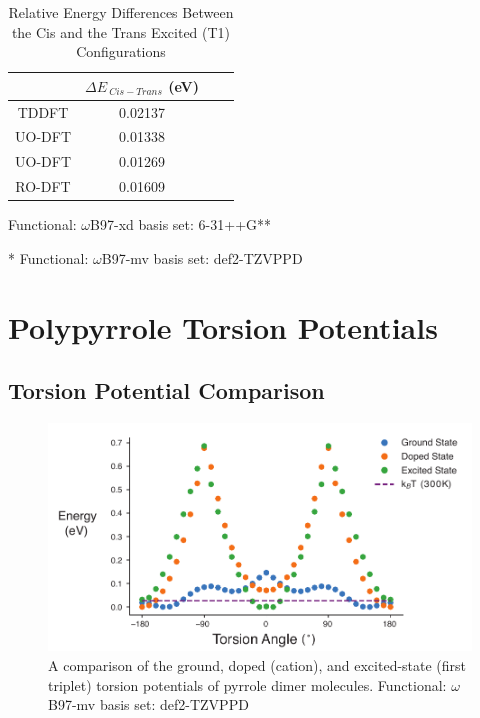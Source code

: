 \begin{table}[hbt!]\centering
\captionsetup{justification=centering}
\captionsetup{width=.6\textwidth}
\captionsetup{skip=2pt}
\caption{Relative Energy Differences Between the Cis and the Trans Excited (T1) Configurations}
\label{tab:ex_ct_gap}
\renewcommand{\arraystretch}{1.5}
\begin{threeparttable}
\begin{tabular}{cccc}\toprule
\multicolumn{1}{c}{\multirow{1}{3.5cm}{\centering }} &
\multicolumn{1}{c}{\multirow{1}{3.5cm}{\centering $\Delta E_{\ Cis - Trans}$ (eV)}} \\ \midrule
    TDDFT\tnote{\textdagger} & 0.02137\\
    UO-DFT\tnote{\textdagger} & 0.01338\\
    UO-DFT\tnote{*} & 0.01269\\
    RO-DFT\tnote{*} & 0.01609\\ \bottomrule
\end{tabular}
\begin{tablenotes}
\item[\textdagger] \footnotesize Functional: $\omega$B97-xd basis set: 6-31++G**
\item[*] \footnotesize Functional: $\omega$B97-mv basis set: def2-TZVPPD
\end{tablenotes}
\end{threeparttable}
\end{table}

\section{Polypyrrole Torsion Potentials}
\label{sec:ppy}
\subsection{Torsion Potential Comparison}

\begin{figure}[hbt!]
    \centering
    \includegraphics{figures/append_tor_model/ppy_torsion_compare.pdf}
    \caption[Comparison of the Ground, Doped, and Excited-state Torsion Potentials of PPy]{A comparison of the ground, doped (cation), and excited-state (first triplet) torsion potentials of pyrrole dimer molecules. Functional: $\omega$B97-mv basis set: def2-TZVPPD}
    \label{fig:ppy_tor}
\end{figure}

